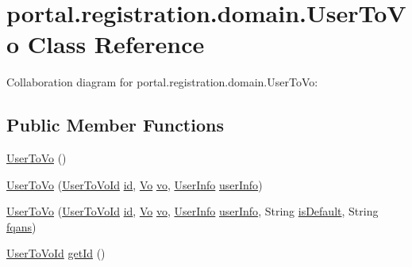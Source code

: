 \hypertarget{classportal_1_1registration_1_1domain_1_1UserToVo}{
\section{portal.registration.domain.UserToVo Class Reference}
\label{classportal_1_1registration_1_1domain_1_1UserToVo}
}


Collaboration diagram for portal.registration.domain.UserToVo:
\subsection*{Public Member Functions}
\begin{DoxyCompactItemize}
\item 
\hyperlink{classportal_1_1registration_1_1domain_1_1UserToVo_abdefd554130610c03e29c5ae7755b3a3}{UserToVo} ()
\item 
\hyperlink{classportal_1_1registration_1_1domain_1_1UserToVo_a6659c208b1cad46ddf701a9e12dddf15}{UserToVo} (\hyperlink{classportal_1_1registration_1_1domain_1_1UserToVoId}{UserToVoId} \hyperlink{classportal_1_1registration_1_1domain_1_1UserToVo_a246bd26e853d70c296f69df06aacea00}{id}, \hyperlink{classportal_1_1registration_1_1domain_1_1Vo}{Vo} \hyperlink{classportal_1_1registration_1_1domain_1_1UserToVo_ad229709d89c14b6517530399c1c5c1e8}{vo}, \hyperlink{classportal_1_1registration_1_1domain_1_1UserInfo}{UserInfo} \hyperlink{classportal_1_1registration_1_1domain_1_1UserToVo_a9584de18496e8a8c2105ece810c4452a}{userInfo})
\item 
\hyperlink{classportal_1_1registration_1_1domain_1_1UserToVo_a473e4ff30fb29afec4bf67aa443a7445}{UserToVo} (\hyperlink{classportal_1_1registration_1_1domain_1_1UserToVoId}{UserToVoId} \hyperlink{classportal_1_1registration_1_1domain_1_1UserToVo_a246bd26e853d70c296f69df06aacea00}{id}, \hyperlink{classportal_1_1registration_1_1domain_1_1Vo}{Vo} \hyperlink{classportal_1_1registration_1_1domain_1_1UserToVo_ad229709d89c14b6517530399c1c5c1e8}{vo}, \hyperlink{classportal_1_1registration_1_1domain_1_1UserInfo}{UserInfo} \hyperlink{classportal_1_1registration_1_1domain_1_1UserToVo_a9584de18496e8a8c2105ece810c4452a}{userInfo}, String \hyperlink{classportal_1_1registration_1_1domain_1_1UserToVo_a27cc1b5973f31bc34b6710a0c33243d2}{isDefault}, String \hyperlink{classportal_1_1registration_1_1domain_1_1UserToVo_a77009c03c4ac817e12c5d470fdd2695e}{fqans})
\item 
\hyperlink{classportal_1_1registration_1_1domain_1_1UserToVoId}{UserToVoId} \hyperlink{classportal_1_1registration_1_1domain_1_1UserToVo_a4dcfae82ecdd91e35c4807e0cc915598}{getId} ()

\end{DoxyCompactItemize}
